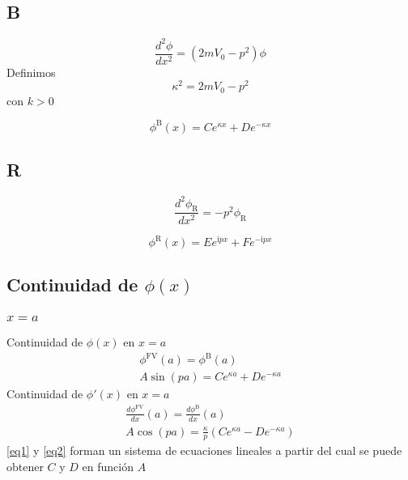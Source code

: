 \documentclass[11pt,a4paper]{article}
\newcommand{\I}{\text{i}}
\begin{document}
\subsection{B}

\begin{equation}
	\frac{d^2\phi}{dx^2}= \left(2mV_0 - p^2 \right)\phi
\end{equation}
Definimos 
\begin{equation}
	\kappa^2 = 2mV_0 - p^2
\end{equation}
con $k > 0$

\begin{equation}
	\phi^{\text{B}}(x) = Ce^{\kappa x} + De^{-\kappa x}
\end{equation}

\subsection{R}

\begin{equation}
	\frac{d^2\phi_{\text{R}}}{dx^2} = -p^2\phi_{\text{R}}
\end{equation}

\begin{equation}
	\phi^{\text{R}}(x) = Ee^{\I px} + Fe^{-\I px}
\end{equation}

\subsection{Continuidad de $\phi(x)$}

\subsubsection{$x =a$}

Continuidad de $\phi(x)$ en $x = a$
\begin{gather}
	\phi^{\text{FV}}(a) = \phi^{\text{B}}(a) \\ \label{eq1}
	A\sin\left(pa\right) = Ce^{\kappa a} + De^{-\kappa a}
\end{gather}
Continuidad de $\phi'(x)$ en $x = a$
\begin{gather}
	\frac{d\phi^{\text{FV}}}{dx}(a) = \frac{d\phi^{\text{B}}}{dx}(a) \\ \label{eq2}	A\cos\left(pa\right) = \frac{\kappa}{p} \left( Ce^{\kappa a} - De^{-\kappa a} \right)
\end{gather}
\eqref{eq1} y \eqref{eq2} forman un sistema de ecuaciones lineales a partir del cual se puede obtener $C$ y $D$ en función $A$
\end{document}
